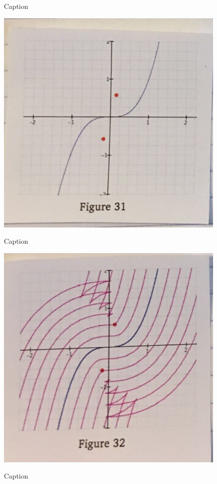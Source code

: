 {\begin{figure}[h]
\begin{minipage}[b]{\w}
      \caption{Caption}
    \end{minipage}
    \begin{minipage}[b]{\w}
      \centering
      \label{crunch:15}
      \includegraphics[width=\fw]{img/09-crunch/15.png}
      \caption{Caption}
    \end{minipage}
    \begin{minipage}[b]{\w}
      \centering
      \label{crunch:16}
      \includegraphics[width=\fw]{img/09-crunch/16.png}
      \caption{Caption}
    \end{minipage}
  \end{figure}

}

